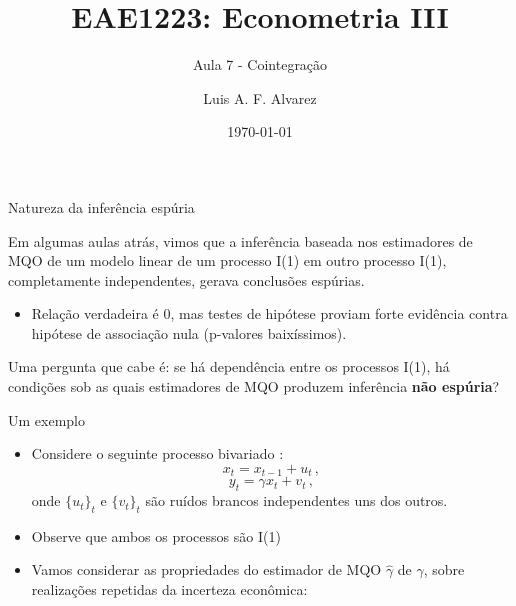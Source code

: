 \documentclass[11pt]{beamer}
\author{Luis A. F. Alvarez}
\title{EAE1223: Econometria III}
\subtitle{Aula 7 - Cointegração}
\date{\today}
\newenvironment{wideitemize}{\itemize\addtolength{\itemsep}{10pt}}{\enditemize}
\begin{document}
\begin{frame}[plain]
	\maketitle
\end{frame}

\begin{frame}{Natureza da inferência espúria}
	\begin{wideitemize}
		\item Em algumas aulas atrás, vimos que a inferência baseada nos estimadores de MQO de um modelo linear de um processo I(1) em outro processo I(1), {\color{blue} completamente independentes}, gerava conclusões espúrias.
		\begin{itemize}
			\item Relação verdadeira é $0$, mas testes de hipótese proviam forte evidência contra hipótese de associação nula  (p-valores baixíssimos).
		\end{itemize}
		\item Uma pergunta que cabe é: se há dependência entre os processos I(1), há condições sob as quais estimadores de MQO produzem inferência \textbf{não espúria}? 
	\end{wideitemize}

\end{frame}

\begin{frame}{Um exemplo}
	\begin{itemize}
		\item Considere o seguinte processo bivariado :
		$$x_t =  x_{t-1}+u_t \, ,$$
		$$ y_t = \gamma x_t + v_t\, ,$$
		onde $\{u_t\}_t$ e $\{v_t\}_t$ são ruídos brancos independentes uns dos outros.
		\item Observe que ambos os processos são I(1)
		\item Vamos considerar as propriedades do estimador de MQO $\hat \gamma$  de $\gamma$, sobre realizações repetidas da incerteza econômica:
	\end{itemize}
\end{frame}
\end{document}
